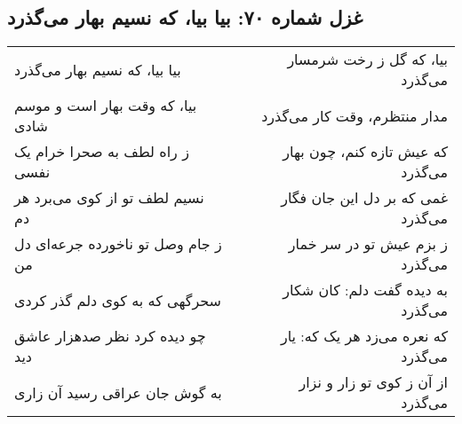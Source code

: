 \begin{center}
\section*{غزل شماره ۷۰: بیا بیا، که نسیم بهار می‌گذرد}
\label{sec:070}
\begin{longtable}{l p{0.5cm} r}
بیا بیا، که نسیم بهار می‌گذرد
&&
بیا، که گل ز رخت شرمسار می‌گذرد
\\
بیا، که وقت بهار است و موسم شادی
&&
مدار منتظرم، وقت کار می‌گذرد
\\
ز راه لطف به صحرا خرام یک نفسی
&&
که عیش تازه کنم، چون بهار می‌گذرد
\\
نسیم لطف تو از کوی می‌برد هر دم
&&
غمی که بر دل این جان فگار می‌گذرد
\\
ز جام وصل تو ناخورده جرعه‌ای دل من
&&
ز بزم عیش تو در سر خمار می‌گذرد
\\
سحرگهی که به کوی دلم گذر کردی
&&
به دیده گفت دلم: کان شکار می‌گذرد
\\
چو دیده کرد نظر صدهزار عاشق دید
&&
که نعره می‌زد هر یک که: یار می‌گذرد
\\
به گوش جان عراقی رسید آن زاری
&&
از آن ز کوی تو زار و نزار می‌گذرد
\\
\end{longtable}
\end{center}
